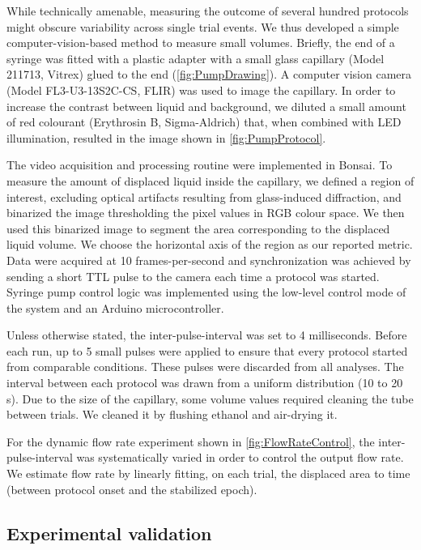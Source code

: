 While technically amenable, measuring the outcome of several hundred protocols might obscure variability across single trial events. We thus developed a simple computer-vision-based method to measure small volumes. Briefly, the end of a syringe was fitted with a plastic adapter with a small glass capillary (Model 211713, Vitrex) glued to the end (\cref{fig:PumpDrawing}). A computer vision camera (Model FL3-U3-13S2C-CS, FLIR) was used to image the capillary.
In order to increase the contrast between liquid and background, we diluted a small amount of red colourant (Erythrosin B, Sigma-Aldrich) that, when combined with LED illumination, resulted in the image shown in \cref{fig:PumpProtocol}.

The video acquisition and processing routine were implemented in Bonsai. To measure the amount of displaced liquid inside the capillary, we defined a region of interest, excluding optical artifacts resulting from glass-induced diffraction, and binarized the image thresholding the pixel values in RGB colour space. We then used this binarized image to segment the area corresponding to the displaced liquid volume. We choose the horizontal axis of the region as our reported metric. Data were acquired at 10 frames-per-second and synchronization was achieved by sending a short TTL pulse to the camera each time a protocol was started. Syringe pump control logic was implemented using the low-level control mode of the system and an Arduino microcontroller.

Unless otherwise stated, the inter-pulse-interval was set to 4 milliseconds. Before each run, up to 5 small pulses were applied to ensure that every protocol started from comparable conditions. These pulses were discarded from all analyses. The interval between each protocol was drawn from a uniform distribution (10 to 20 s). Due to the size of the capillary, some volume values required cleaning the tube between trials. We cleaned it by flushing ethanol and air-drying it.

For the dynamic flow rate experiment shown in \cref{fig:FlowRateControl}, the inter-pulse-interval was systematically varied in order to control the output flow rate. We estimate flow rate by linearly fitting, on each trial, the displaced area to time (between protocol onset and the stabilized epoch).

\subsection*{Experimental validation}

